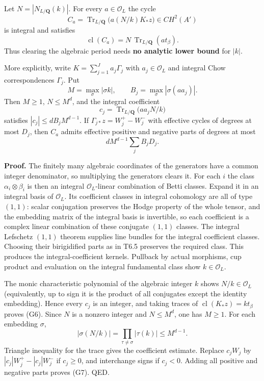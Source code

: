 Let \(N=|N_{L/\mathbf Q}(k)|\). For every \(a\in\mathcal O_L\) the cycle \[
C_a=\operatorname{Tr}_{L/\mathbf Q}\bigl(a(N/k)K_*z\bigr)\in CH^2(A')
\] is integral and satisfies \[
\operatorname{cl}(C_a)=N\,\operatorname{Tr}_{L/\mathbf Q}(a t_\beta).
\tag{G6}
\] Thus clearing the algebraic period needs \textbf{no analytic lower bound} for \(|k|\).

More explicitly, write \(K=\sum_{j=1}^J a_j\Gamma_j\) with \(a_j\in\mathcal O_L\) and integral Chow correspondences \(\Gamma_j\). Put \[
M=\max_\sigma|\sigma k|,\qquad B_j=\max_\sigma|\sigma(a a_j)|.
\] Then \(M\ge1\), \(N\le M^d\), and the integral coefficient \[
c_j=\operatorname{Tr}_{L/\mathbf Q}\bigl(a a_j N/k\bigr)
\] satisfies \(|c_j|\le d B_jM^{d-1}\). If \(\Gamma_{j*}z=W_j^+-W_j^-\) with effective cycles of degrees at most \(D_j\), then \(C_a\) admits effective positive and negative parts of degrees at most \[
dM^{d-1}\sum_j B_jD_j.
\tag{G7}
\]

\textbf{Proof.} The finitely many algebraic coordinates of the generators have a common integer denominator, so multiplying the generators clears it. For each \(i\) the class \(\alpha_i\otimes\beta_i\) is then an integral \(\mathcal O_L\)-linear combination of Betti classes. Expand it in an integral basis of \(\mathcal O_L\). Its coefficient classes in integral cohomology are all of type \((1,1)\): scalar conjugation preserves the Hodge property of the whole tensor, and the embedding matrix of the integral basis is invertible, so each coefficient is a complex linear combination of these conjugate \((1,1)\) classes. The integral Lefschetz \((1,1)\) theorem supplies line bundles for the integral coefficient classes. Choosing their birigidified parts as in T6.5 preserves the required class. This produces the integral-coefficient kernels. Pullback by actual morphisms, cup product and evaluation on the integral fundamental class show \(k\in\mathcal O_L\).

The monic characteristic polynomial of the algebraic integer \(k\) shows \(N/k\in\mathcal O_L\) (equivalently, up to sign it is the product of all conjugates except the identity embedding). Hence every \(c_j\) is an integer, and taking traces of \(\operatorname{cl}(K_*z)=kt_\beta\) proves (G6). Since \(N\) is a nonzero integer and \(N\le M^d\), one has \(M\ge1\). For each embedding \(\sigma\), \[
|\sigma(N/k)|=\prod_{\tau\ne\sigma}|\tau(k)|\le M^{d-1}.
\] Triangle inequality for the trace gives the coefficient estimate. Replace \(c_jW_j\) by \(|c_j|W_j^+-|c_j|W_j^-\) if \(c_j\ge0\), and interchange signs if \(c_j<0\). Adding all positive and negative parts proves (G7). QED.

